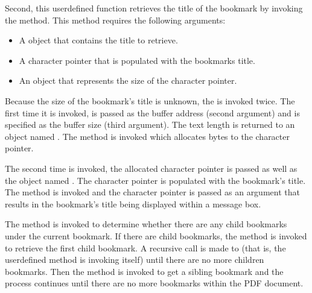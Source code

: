 \documentclass[letterpaper,12pt,english,openany,oneside]{sphinxmanual}
\begin{document}
Second, this user\sphinxhyphen{}defined function retrieves the title of the bookmark by invoking the  method. This method requires the following arguments:
\begin{itemize}
\item {} 
A  object that contains the title to retrieve.

\item {} 
A character pointer that is populated with the bookmarks title.

\item {} 
An  object that represents the size of the character pointer.

\end{itemize}

Because the size of the bookmark’s title is unknown, the  is invoked twice. The first time it is invoked,  is passed as the buffer address (second argument) and  is specified as the buffer size (third argument). The text length is returned to an  object named . The  method is invoked which allocates  bytes to the character pointer.

The second time  is invoked, the allocated character pointer is passed as well as the  object named . The character pointer is populated with the bookmark’s title. The  method is invoked and the character pointer is passed as an argument that results in the bookmark’s title being displayed within a message box.

The  method is invoked to determine whether there are any child bookmarks under the current bookmark. If there are child bookmarks, the  method is invoked to retrieve the first child bookmark. A recursive call is made to  (that is, the user\sphinxhyphen{}defined method is invoking itself) until there are no more children bookmarks. Then the  method is invoked to get a sibling bookmark and the process continues until there are no more bookmarks within the PDF document.
\end{document}
